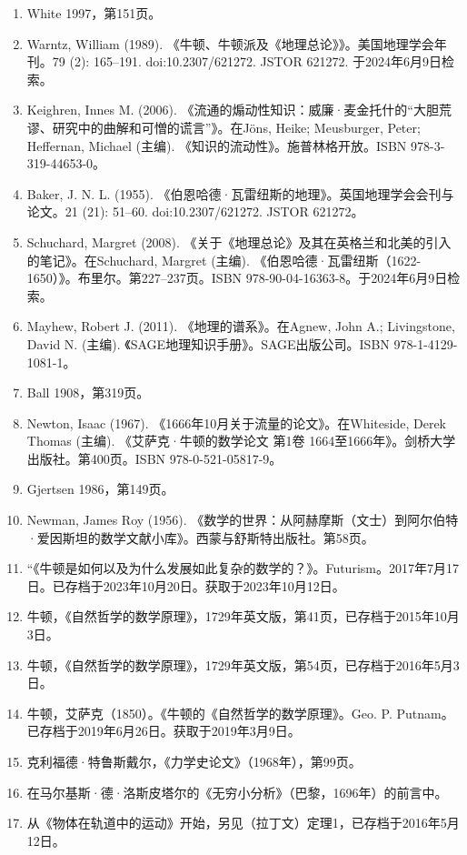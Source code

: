 \begin{enumerate}
\item White 1997，第151页。  
\item Warntz, William (1989). 《牛顿、牛顿派及《地理总论》》。美国地理学会年刊。79 (2): 165–191. doi:10.2307/621272. JSTOR 621272. 于2024年6月9日检索。  
\item Keighren, Innes M. (2006). 《流通的煽动性知识：威廉·麦金托什的“大胆荒谬、研究中的曲解和可憎的谎言”》。在Jöns, Heike; Meusburger, Peter; Heffernan, Michael (主编). 《知识的流动性》。施普林格开放。ISBN 978-3-319-44653-0。
\item Baker, J. N. L. (1955). 《伯恩哈德·瓦雷纽斯的地理》。英国地理学会会刊与论文。21 (21): 51–60. doi:10.2307/621272. JSTOR 621272。  
\item Schuchard, Margret (2008). 《关于《地理总论》及其在英格兰和北美的引入的笔记》。在Schuchard, Margret (主编). 《伯恩哈德·瓦雷纽斯（1622-1650）》。布里尔。第227–237页。ISBN 978-90-04-16363-8。于2024年6月9日检索。  
\item Mayhew, Robert J. (2011). 《地理的谱系》。在Agnew, John A.; Livingstone, David N. (主编). 《SAGE地理知识手册》。SAGE出版公司。ISBN 978-1-4129-1081-1。  
\item Ball 1908，第319页。
\item Newton, Isaac (1967). 《1666年10月关于流量的论文》。在Whiteside, Derek Thomas (主编). 《艾萨克·牛顿的数学论文 第1卷 1664至1666年》。剑桥大学出版社。第400页。ISBN 978-0-521-05817-9。  
\item Gjertsen 1986，第149页。  
\item Newman, James Roy (1956). 《数学的世界：从阿赫摩斯（文士）到阿尔伯特·爱因斯坦的数学文献小库》。西蒙与舒斯特出版社。第58页。
\item “《牛顿是如何以及为什么发展如此复杂的数学的？》。Futurism。2017年7月17日。已存档于2023年10月20日。获取于2023年10月12日。  
\item 牛顿，《自然哲学的数学原理》，1729年英文版，第41页，已存档于2015年10月3日。  
\item 牛顿，《自然哲学的数学原理》，1729年英文版，第54页，已存档于2016年5月3日。  
\item 牛顿，艾萨克（1850）。《牛顿的《自然哲学的数学原理》。Geo. P. Putnam。已存档于2019年6月26日。获取于2019年3月9日。
\item 克利福德·特鲁斯戴尔，《力学史论文》（1968年），第99页。  
\item 在马尔基斯·德·洛斯皮塔尔的《无穷小分析》（巴黎，1696年）的前言中。  
\item 从《物体在轨道中的运动》开始，另见（拉丁文）定理1，已存档于2016年5月12日。  

\end{enumerate}
